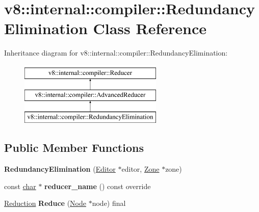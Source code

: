 \hypertarget{classv8_1_1internal_1_1compiler_1_1RedundancyElimination}{}\section{v8\+:\+:internal\+:\+:compiler\+:\+:Redundancy\+Elimination Class Reference}
\label{classv8_1_1internal_1_1compiler_1_1RedundancyElimination}
Inheritance diagram for v8\+:\+:internal\+:\+:compiler\+:\+:Redundancy\+Elimination\+:\begin{figure}[H]
\begin{center}
\leavevmode
\includegraphics[height=3.000000cm]{classv8_1_1internal_1_1compiler_1_1RedundancyElimination}
\end{center}
\end{figure}
\subsection*{Public Member Functions}
\begin{DoxyCompactItemize}
\item 
\mbox{\label{classv8_1_1internal_1_1compiler_1_1RedundancyElimination_a66224cd6ad3be9044a0e80c57f1db35d}} 
{\bfseries Redundancy\+Elimination} (\mbox{\hyperlink{classv8_1_1internal_1_1compiler_1_1AdvancedReducer_1_1Editor}{Editor}} $\ast$editor, \mbox{\hyperlink{classv8_1_1internal_1_1Zone}{Zone}} $\ast$zone)
\item 
\mbox{\label{classv8_1_1internal_1_1compiler_1_1RedundancyElimination_ab2e068d1d1249997d672f5708db85d62}} 
const \mbox{\hyperlink{classchar}{char}} $\ast$ {\bfseries reducer\+\_\+name} () const override
\item 
\mbox{\label{classv8_1_1internal_1_1compiler_1_1RedundancyElimination_a7c11b6061e0cf7e6d1cda44ec18398fc}} 
\mbox{\hyperlink{classv8_1_1internal_1_1compiler_1_1Reduction}{Reduction}} {\bfseries Reduce} (\mbox{\hyperlink{classv8_1_1internal_1_1compiler_1_1Node}{Node}} $\ast$node) final
\end{DoxyCompactItemize}
